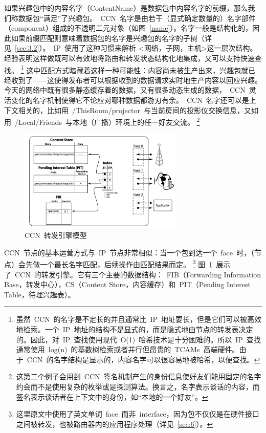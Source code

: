 如果兴趣包中的内容名字（ContentName）是数据包中内容名字的前缀，那么我们称数据包“满足”了兴趣包。~CCN~名字是由若干（显式确定数量的）名字部件（component）组成的不透明二元对象（如图~\ref{name}）。名字一般是结构化的，因此如果前缀匹配则意味着数据包的名字是兴趣包的名字的子树（详见~\ref{sec:3.2}）。~IP~使用了这种习惯来解析 <网络，子网，主机>这一层次结构。经验表明这样做既可以有效地将路由和转发状态结构化地集成，又可以支持快速查找。%
\renewcommand\baselinestretch{1} %
\footnote{虽然~CCN~的名字是不定长的并且通常比~IP~地址要长，但是它们可以被高效地检索。一个~IP~地址的结构不是显式的，而是隐式地由节点的转发表决定的。因此，对~IP~查找使用现代~O(1)~哈希技术是十分困难的。所以~IP~查找通常使用~log(n)~的基数树检索或者并行但昂贵的~TCAMs~高端硬件。由于~CCN~的名字结构是显示的，内容名字可以很容易地被哈希，以便查找。}
这中匹配方式暗藏着这样一种可能性：内容尚未被生产出来，兴趣包就已经收到了——这使得发布者可以根据收到的数据请求实时地生产内容以回应兴趣。今天的网络中既有很多静态缓存着的数据，又有很多动态生成的数据，~CCN~灵活变化的名字机制使得它不论应对哪种数据都游刃有余。~CCN~名字还可以是上下文相关的，比如用~/ThisRoom/projector~与当前房间的投影仪交换信息，又如用~/Local/Friends~与本地（广播）环境上的任一好友交流。
\renewcommand\baselinestretch{1} %
\footnote{这第二个例子会用到~CCN~签名机制产生的身份信息使好友们能用固定的名字约会而不是使用复杂的枚举或是探测算法。换言之，名字表示谈话的内容，而签名表示谈话者在上下文中的身份，如“本地的一个好友”。}

\begin{figure}[htbp]
  \centering
  \includegraphics[width=0.7\textwidth]{images/engine}
  \caption{CCN~转发引擎模型} 
  \label{engine}
\end{figure}

CCN~节点的基本运营方式与~IP~节点非常相似：当一个包到达一个~face~时，（节点）会先做一个最长名字匹配，后续操作由匹配结果而定。
\renewcommand\baselinestretch{1} %
\footnote{这里原文中使用了英文单词~face~而非~interface，因为包不仅仅是在硬件接口之间被转发，也被路由器内的应用程序处理（详见~\ref{sec:6}）。}
图~\ref{engine}~展示了~CCN~的转发引擎。它有三个主要的数据结构：~FIB（Forwarding Information Base，转发中心），CS（Content Store，内容缓存）和~PIT（Pending Interest Table，待理兴趣表）。


